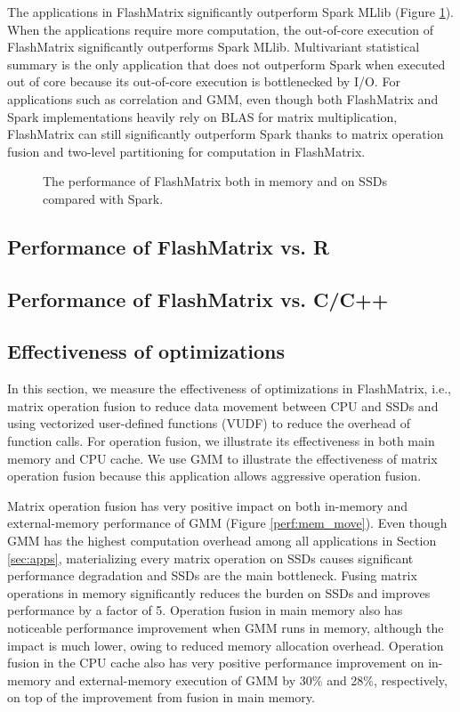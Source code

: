 The applications in FlashMatrix significantly outperform Spark MLlib (Figure
\ref{perf:fm}). When the applications require more computation, the out-of-core
execution of FlashMatrix significantly outperforms Spark MLlib. Multivariant
statistical summary is the only application that does not outperform Spark
when executed out of core because its out-of-core execution is bottlenecked
by I/O. For applications such as correlation and GMM, even though both FlashMatrix
and Spark implementations heavily rely on BLAS for matrix multiplication,
FlashMatrix can still significantly outperform Spark thanks to matrix operation
fusion and two-level partitioning for computation in FlashMatrix.

\begin{figure}
	\begin{center}
		\footnotesize
		
		\caption{The performance of FlashMatrix both in memory and on SSDs
		compared with Spark.}
		\label{perf:fm}
	\end{center}
\end{figure}

\subsection{Performance of FlashMatrix vs. R}

\subsection{Performance of FlashMatrix vs. C/C++}

\subsection{Effectiveness of optimizations}

In this section, we measure the effectiveness of optimizations in FlashMatrix,
i.e., matrix operation fusion to reduce data movement between CPU and SSDs and
using vectorized user-defined functions (VUDF) to reduce the overhead of
function calls. For operation fusion, we illustrate its effectiveness in both
main memory and CPU cache. We use GMM to illustrate the effectiveness of matrix
operation fusion because this application allows aggressive operation fusion.

Matrix operation fusion has very positive impact on both in-memory and
external-memory performance of GMM (Figure \ref{perf:mem_move}). Even though
GMM has the highest computation overhead among all applications in Section
\ref{sec:apps}, materializing every matrix operation on SSDs causes significant
performance degradation and SSDs are the main bottleneck. Fusing matrix
operations in memory significantly reduces the burden on SSDs and improves
performance by a factor of 5. Operation fusion in main memory also has noticeable
performance improvement when GMM runs in memory, although the impact is much
lower, owing to reduced memory allocation overhead. Operation fusion in
the CPU cache also has very positive performance improvement on in-memory
and external-memory execution of GMM by 30\% and 28\%, respectively, on top of
the improvement from fusion in main memory.

